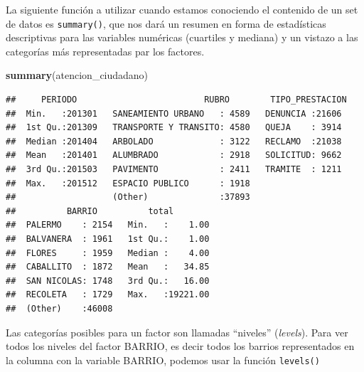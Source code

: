 \documentclass[]{book}
\newenvironment{Shaded}{\begin{snugshade}}{\end{snugshade}}
\newcommand{\KeywordTok}[1]{\textcolor[rgb]{0.13,0.29,0.53}{\textbf{#1}}}
\newcommand{\OperatorTok}[1]{\textcolor[rgb]{0.81,0.36,0.00}{\textbf{#1}}}
\newcommand{\NormalTok}[1]{#1}
\begin{document}
La siguiente función a utilizar cuando estamos conociendo el contenido
de un set de datos es \texttt{summary()}, que nos dará un resumen en
forma de estadísticas descriptivas para las variables numéricas
(cuartiles y mediana) y un vistazo a las categorías más representadas
par los factores.

\begin{Shaded}
\begin{Highlighting}[]
\KeywordTok{summary}\NormalTok{(atencion_ciudadano)}
\end{Highlighting}
\end{Shaded}

\begin{verbatim}
##     PERIODO                         RUBRO        TIPO_PRESTACION 
##  Min.   :201301   SANEAMIENTO URBANO   : 4589   DENUNCIA :21606  
##  1st Qu.:201309   TRANSPORTE Y TRANSITO: 4580   QUEJA    : 3914  
##  Median :201404   ARBOLADO             : 3122   RECLAMO  :21038  
##  Mean   :201401   ALUMBRADO            : 2918   SOLICITUD: 9662  
##  3rd Qu.:201503   PAVIMENTO            : 2411   TRAMITE  : 1211  
##  Max.   :201512   ESPACIO PUBLICO      : 1918                    
##                   (Other)              :37893                    
##          BARRIO          total         
##  PALERMO    : 2154   Min.   :    1.00  
##  BALVANERA  : 1961   1st Qu.:    1.00  
##  FLORES     : 1959   Median :    4.00  
##  CABALLITO  : 1872   Mean   :   34.85  
##  SAN NICOLAS: 1748   3rd Qu.:   16.00  
##  RECOLETA   : 1729   Max.   :19221.00  
##  (Other)    :46008
\end{verbatim}

Las categorías posibles para un factor son llamadas ``niveles''
(\emph{levels}). Para ver todos los niveles del factor BARRIO, es decir
todos los barrios representados en la columna con la variable BARRIO,
podemos usar la función \texttt{levels()}

\begin{Shaded}
\end{Shaded}
\end{document}
